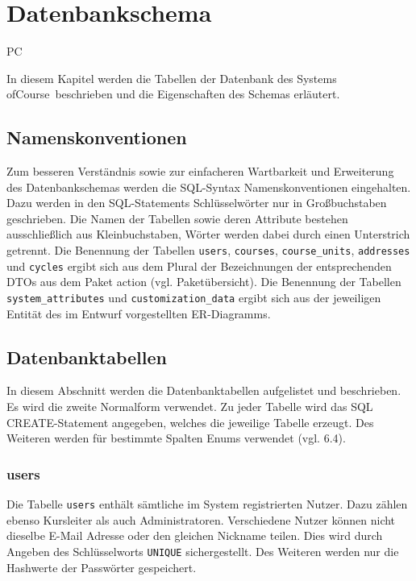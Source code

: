 \chapter{Datenbankschema}

\begin{tiny}
PC
\end{tiny}

In diesem Kapitel werden die Tabellen der Datenbank des Systems \grqq ofCourse\grqq\ beschrieben und die Eigenschaften des Schemas erläutert.

\section{Namenskonventionen}
Zum besseren Verständnis sowie zur einfacheren Wartbarkeit und Erweiterung des Datenbankschemas werden die SQL-Syntax Namenskonventionen eingehalten. Dazu werden in den SQL-Statements Schlüsselwörter nur in Großbuchstaben geschrieben. Die Namen der Tabellen sowie deren Attribute bestehen ausschließlich aus Kleinbuchstaben, Wörter werden dabei durch einen Unterstrich getrennt. Die Benennung der Tabellen \texttt{users}, \texttt{courses}, \texttt{course\_units}, \texttt{addresses} und \texttt{cycles} ergibt sich aus dem Plural der Bezeichnungen der entsprechenden DTOs aus dem Paket action (vgl. Paketübersicht). Die Benennung der Tabellen \texttt{system\_attributes} und \texttt{customization\_data} ergibt sich aus der jeweiligen Entität des im Entwurf vorgestellten ER-Diagramms.

\section{Datenbanktabellen}
In diesem Abschnitt werden die Datenbanktabellen aufgelistet und beschrieben. Es wird die zweite Normalform verwendet. Zu jeder Tabelle wird das SQL CREATE-Statement angegeben, welches die jeweilige Tabelle erzeugt. Des Weiteren werden für bestimmte Spalten Enums verwendet (vgl. 6.4).

\subsection{users}
Die Tabelle \texttt{users} enthält sämtliche im System registrierten Nutzer. Dazu zählen ebenso Kursleiter als auch Administratoren. Verschiedene Nutzer können nicht dieselbe E-Mail Adresse oder den gleichen Nickname teilen. Dies wird durch Angeben des Schlüsselworts \texttt{UNIQUE} sichergestellt. Des Weiteren werden nur die Hashwerte der Passwörter gespeichert.
	
